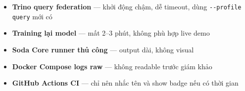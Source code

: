 \documentclass[12pt, a4paper]{article}
\begin{document}
\vspace{1em}

\begin{tcolorbox}[colback=red!5, colframe=red!40, arc=6pt,
  title={\faTimesCircle\ Những thứ KHÔNG demo}]
\begin{itemize}[leftmargin=1.5em, itemsep=4pt]
  \item \textbf{Trino query federation} --- khởi động chậm, dễ timeout, dùng
        \texttt{-{}-profile query} mới có
  \item \textbf{Training lại model} --- mất 2--3 phút, không phù hợp live demo
  \item \textbf{Soda Core runner thủ công} --- output dài, không visual
  \item \textbf{Docker Compose logs raw} --- không readable trước giám khảo
  \item \textbf{GitHub Actions CI} --- chỉ nên nhắc tên và show badge nếu có thời gian
\end{itemize}
\end{tcolorbox}

\end{document}
